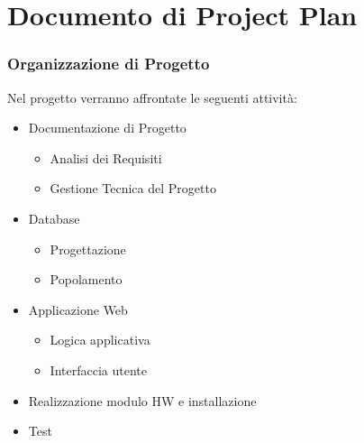 \documentclass[a4paper,12pt]{beamer}
\begin{document}
\section{Documento di Project Plan}
\begin{frame}
\frametitle{Organizzazione di Progetto}
Nel progetto verranno affrontate le seguenti attività:
\begin{itemize}
\item Documentazione di Progetto
\begin{itemize}
\item Analisi dei Requisiti
\item Gestione Tecnica del Progetto
\end{itemize}
\item Database
\begin{itemize}
\item Progettazione 
\item Popolamento
\end{itemize}
\item Applicazione Web
\begin{itemize}
\item Logica applicativa
\item Interfaccia utente
\end{itemize}
\item Realizzazione modulo HW e installazione
\item Test
\end{itemize}
\end{frame}

\pagebreak
\end{document}
